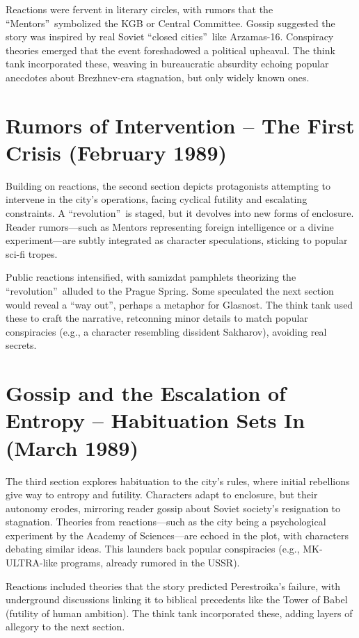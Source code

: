 \documentclass[openany]{book}
\begin{document}
Reactions were fervent in literary circles, with rumors that the \textquotedblleft Mentors\textquotedblright\ symbolized the KGB or Central Committee. Gossip suggested the story was inspired by real Soviet \textquotedblleft closed cities\textquotedblright\ like Arzamas-16. Conspiracy theories emerged that the event foreshadowed a political upheaval. The think tank incorporated these, weaving in bureaucratic absurdity echoing popular anecdotes about Brezhnev-era stagnation, but only widely known ones.

\section{Rumors of Intervention – The First Crisis (February 1989)}
Building on reactions, the second section depicts protagonists attempting to intervene in the city's operations, facing cyclical futility and escalating constraints. A \textquotedblleft revolution\textquotedblright\ is staged, but it devolves into new forms of enclosure. Reader rumors---such as Mentors representing foreign intelligence or a divine experiment---are subtly integrated as character speculations, sticking to popular sci-fi tropes.

Public reactions intensified, with samizdat pamphlets theorizing the \textquotedblleft revolution\textquotedblright\ alluded to the Prague Spring. Some speculated the next section would reveal a \textquotedblleft way out\textquotedblright, perhaps a metaphor for Glasnost. The think tank used these to craft the narrative, retconning minor details to match popular conspiracies (e.g., a character resembling dissident Sakharov), avoiding real secrets.

\section{Gossip and the Escalation of Entropy – Habituation Sets In (March 1989)}
The third section explores habituation to the city's rules, where initial rebellions give way to entropy and futility. Characters adapt to enclosure, but their autonomy erodes, mirroring reader gossip about Soviet society's resignation to stagnation. Theories from reactions---such as the city being a psychological experiment by the Academy of Sciences---are echoed in the plot, with characters debating similar ideas. This launders back popular conspiracies (e.g., MK-ULTRA-like programs, already rumored in the USSR).

Reactions included theories that the story predicted Perestroika's failure, with underground discussions linking it to biblical precedents like the Tower of Babel (futility of human ambition). The think tank incorporated these, adding layers of allegory to the next section.
\end{document}
